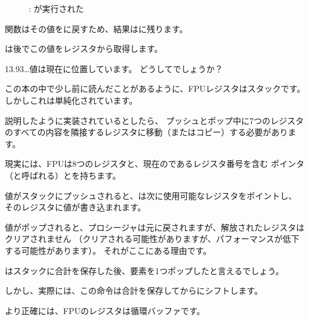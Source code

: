 \begin{figure}[H]
\centering
{}
\caption{\olly: \FADDP が実行された}
\label{fig:FPU_simple_olly_5}
\end{figure}

関数はその値をに戻すため、結果はに残ります。

\main は後でこの値をレジスタから取得します。

13.93\ldots 値は現在に位置しています。
どうしてでしょうか？

\label{FPU_is_rather_circular_buffer}

この本の中で少し前に読んだことがあるように、\ac{FPU}レジスタはスタックです。
しかしこれは単純化されています。

説明したように実装されているとしたら、
プッシュとポップ中に7つのレジスタのすべての内容を隣接するレジスタに移動（またはコピー）する必要があります。

現実には、\ac{FPU}は8つのレジスタと、現在のであるレジスタ番号を含む
ポインタ（と呼ばれる）とを持ちます。

値がスタックにプッシュされると、は次に使用可能なレジスタをポイントし、
そのレジスタに値が書き込まれます。

値がポップされると、プロシージャは元に戻されますが、解放されたレジスタはクリアされません
（クリアされる可能性がありますが、パフォーマンスが低下する可能性があります）。
それがここにある理由です。

\FADDP はスタックに合計を保存した後、要素を1つポップしたと言えるでしょう。

しかし、実際には、この命令は合計を保存してからにシフトします。

より正確には、\ac{FPU}のレジスタは循環バッファです。
